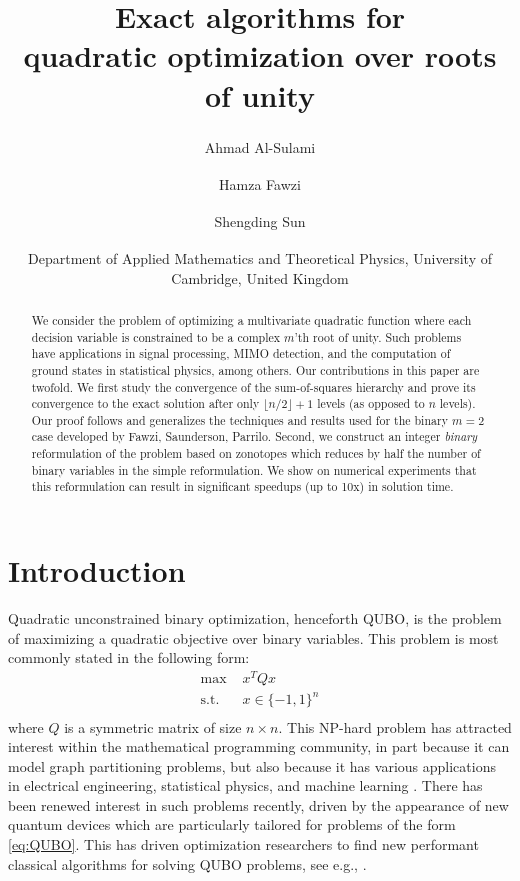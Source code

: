 \documentclass{article}
\title{Exact algorithms for \\
quadratic optimization over roots of unity}
\date{\textsuperscript{\textdagger} Department of Applied Mathematics and Theoretical Physics, University of Cambridge,
United Kingdom }
\author{Ahmad Al-Sulami\textsuperscript{\textdagger} \and Hamza Fawzi\textsuperscript{\textdagger} \and Shengding Sun\textsuperscript{\textdagger}}
\theoremstyle{definition}
\begin{document}
\maketitle
\begin{abstract}
We consider the problem of optimizing a multivariate quadratic function where each decision variable is constrained to be a complex $m$'th root of unity. Such problems have applications in signal processing, MIMO detection, and the computation of ground states in statistical physics, among others.
Our contributions in this paper are twofold.
We first study the convergence of the sum-of-squares hierarchy and prove its convergence to the exact solution after only $\lfloor n/2\rfloor+1$ levels (as opposed to $n$ levels). Our proof follows and generalizes the techniques and results used for the binary $m=2$ case developed by Fawzi, Saunderson, Parrilo.  
Second, we construct an integer \emph{binary} reformulation of the problem based on zonotopes which reduces by half the number of binary variables in the simple reformulation. We show on numerical experiments that this reformulation can result in significant speedups (up to 10x) in solution time.
\end{abstract}
\section{Introduction}


Quadratic unconstrained binary optimization, henceforth QUBO, is the problem of maximizing a quadratic objective over binary variables.
This problem is most commonly stated in the following form:
\begin{equation} \label{eq:QUBO}
    \begin{aligned}
        \text{max } & x^T Qx\\
        \text{s.t. }&  x\in \{-1,1\}^n\\
    \end{aligned}
\end{equation}
where $Q$ is a symmetric matrix of size $n \times n$.
This NP-hard problem has attracted interest within the mathematical programming community, in part because it can model graph partitioning problems, but also because it has various applications in electrical engineering, statistical physics, and machine learning \cite{poljak1995maximum,ding2001min,barahona1988application}. There has been renewed interest in such problems recently, driven by the appearance of new quantum devices which are particularly tailored for problems of the form \eqref{eq:QUBO}. This has driven optimization researchers to find new performant classical algorithms for solving QUBO problems, see e.g., \cite{dunning2018works,madam,junger2021quantum,rehfeldt2023faster}. 
\end{document}
